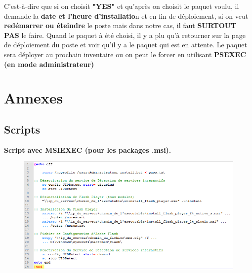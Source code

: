 \documentclass[11pt,a4paper,oneside]{article}
\begin{document}
C'est-à-dire que si on choisit \textbf{"YES"} et qu'après on choisit le paquet voulu, il demande la \textbf{date et l'heure d'installatio}n et en fin de déploiement, si on veut \textbf{redémarrer ou éteindre} le poste mais dans notre cas, il faut \textbf{SURTOUT PAS} le faire. Quand le paquet à été choisi, il y a plu qu'à retourner sur la page de déploiement du poste et voir qu'il y a le paquet qui est en attente. Le paquet sera déployer au prochain inventaire ou on peut le forcer en utilisant \textbf{PSEXEC (en mode administrateur)}
\newpage
\section{Annexes}
\subsection{Scripts}
\textbf{Script avec MSIEXEC (pour les packages .msi).}
\begin{figure}[hbtp]
\centering
\includegraphics[scale=0.9]{Script/Flash.PNG}
\end{figure}
\end{document}
